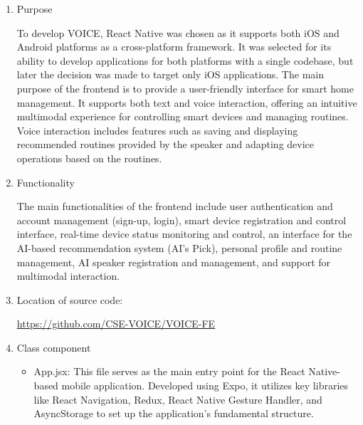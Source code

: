 \documentclass[conference]{IEEEtran}
\begin{document}
\begin{enumerate}[label=\arabic*]
    \item Purpose\par
    \vspace{0.3em}
    To develop VOICE, React Native was chosen as it supports both iOS and Android platforms as a cross-platform framework. It was selected for its ability to develop applications for both platforms with a single codebase, but later the decision was made to target only iOS applications. The main purpose of the frontend is to provide a user-friendly interface for smart home management. It supports both text and voice interaction, offering an intuitive multimodal experience for controlling smart devices and managing routines. Voice interaction includes features such as saving and displaying recommended routines provided by the speaker and adapting device operations based on the routines.

    \vspace{1em}

    \item Functionality\par
    \vspace{0.3em}
    The main functionalities of the frontend include user authentication and account management (sign-up, login), smart device registration and control interface, real-time device status monitoring and control, an interface for the AI-based recommendation system (AI's Pick), personal profile and routine management, AI speaker registration and management, and support for multimodal interaction.

    \vspace{1em}

    \item Location of source code:\par
    \vspace{0.3em}
    \href{https://github.com/CSE-VOICE/VOICE-FE}{https://github.com/CSE-VOICE/VOICE-FE}

    \vspace{1em}

    \item Class component\par
    \vspace{0.3em}
    
    \begin{itemize}[label=-]
        \item App.jsx: This file serves as the main entry point for the React Native-based mobile application. Developed using Expo, it utilizes key libraries like React Navigation, Redux, React Native Gesture Handler, and AsyncStorage to set up the application's fundamental structure.
        \vspace{0.7em}
        

\end{itemize}
\end{enumerate}
\end{document}
